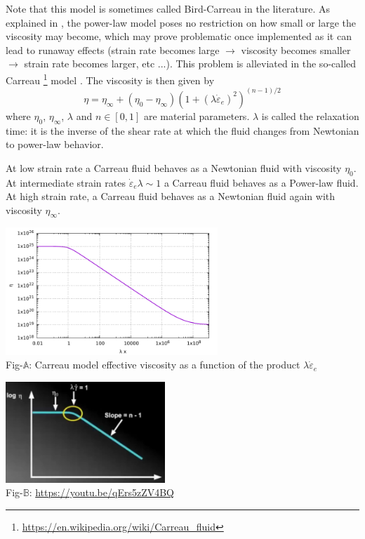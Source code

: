 Note that this model is sometimes called Bird-Carreau in the literature. 
As explained in \cite{reddybook2}, the power-law model poses no restriction on 
how small or large the viscosity may become, which may prove problematic once 
implemented as it can lead to runaway effects (strain rate becomes large $\rightarrow$
viscosity becomes smaller $\rightarrow$ strain rate becomes larger, etc ...).
This problem is alleviated in the so-called Carreau
\footnote{\url{https://en.wikipedia.org/wiki/Carreau_fluid}} model \cite{zifr07}. 
The viscosity is then given by
\begin{equation}
\eta = \eta_\infty + (\eta_0-\eta_\infty) \left(1 + (\lambda \dot{\varepsilon}_{e})^2 \right)^{(n-1)/2}
\end{equation}
where $\eta_0$, $\eta_\infty$, $\lambda$ and $n\in[0,1]$ are material parameters. 
$\lambda$ is called the relaxation time: it is the inverse of the shear rate at which 
the fluid changes from Newtonian to power-law behavior.

At low strain rate a Carreau fluid behaves as a Newtonian fluid with viscosity $\eta_0$.
At intermediate strain rates $\dot{\varepsilon}_{e} \lambda \sim 1$ a Carreau fluid behaves 
as a Power-law fluid. At high strain rate, a Carreau fluid behaves as a Newtonian fluid 
again with viscosity $\eta_\infty$.
 
\begin{center}
\includegraphics[width=8cm]{images/rheology/carreau/carreau.pdf}\\
{\captionfont Fig-$\mathds{A}$: Carreau model effective viscosity as a function of the product $\lambda \dot{\varepsilon}_{e}$}
\end{center}

\begin{center}
\includegraphics[width=6cm]{images/rheology/carreau/carreau1}\\
{\captionfont Fig-$\mathds{B}$: \url{https://youtu.be/qErs5zZV4BQ}}
\end{center}

